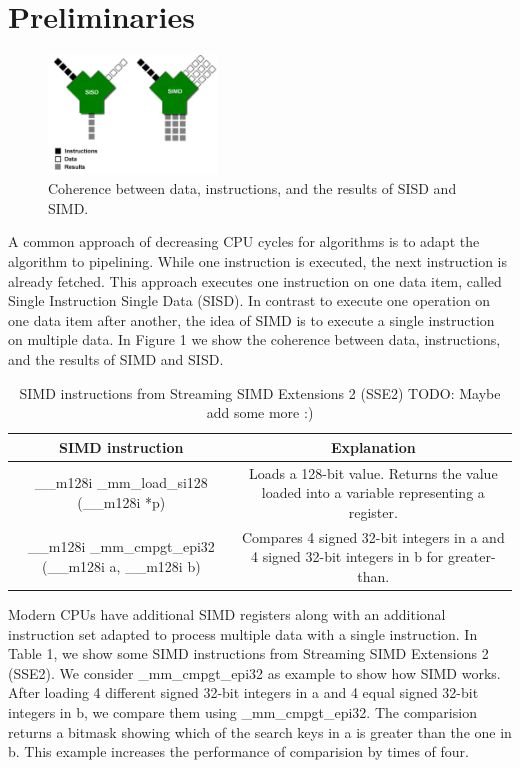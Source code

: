 \documentclass[conference]{IEEEtran}
\begin{document}
\section{Preliminaries}
\begin{figure}
	\includegraphics[width=0.4\textwidth]{figure_1.png}
	\caption{Coherence between data, instructions, and the results of SISD and SIMD.}
	\label{fig}
\end{figure}
A common approach of decreasing CPU cycles for algorithms is to adapt the algorithm to pipelining. While one instruction is executed, the next instruction is already fetched. This approach executes one instruction on one data item, called Single Instruction Single Data (SISD). In contrast to execute one operation on one data item after another, the idea of SIMD is to execute a single instruction on multiple data. In Figure 1 we show the coherence between data, instructions, and the results of SIMD and SISD. 
\begin{table}[htbp]
	\caption{SIMD instructions from Streaming SIMD Extensions 2 (SSE2) TODO: Maybe add some more :)}
	\begin{center}
		\begin{tabular}{|c|c|}
			\hline
			\textbf{SIMD instruction}&\textbf{Explanation}\\
			\hline
			\_\_m128i \_mm\_load\_si128 (\_\_m128i *p) & Loads a 128-bit value. Returns the value loaded into a variable representing a register.\\
			\_\_m128i \_mm\_cmpgt\_epi32 (\_\_m128i a, \_\_m128i b) & Compares 4 signed 32-bit integers in a and 4 signed 32-bit integers
			in b for greater-than.\\
			\hline
		\end{tabular}
		\label{tab1}
	\end{center}
\end{table}
Modern CPUs have additional SIMD registers along with an additional instruction set adapted to process multiple data with a single instruction. In Table 1, we show some SIMD instructions from Streaming SIMD Extensions 2 (SSE2). We consider \_mm\_cmpgt\_epi32 as example to show how SIMD works. After loading 4 different signed 32-bit integers in a and 4 equal signed 32-bit integers in b, we compare them using \_mm\_cmpgt\_epi32. The comparision returns a bitmask showing which of the search keys in a is greater than the one in b. This example increases the performance of comparision by times of four. 
\end{document}
